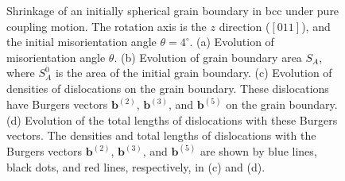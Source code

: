 \documentclass[smallextended]{svjour3}
\begin{document}
%

\begin{figure}[htbp]
	\centering
	\caption{Shrinkage of an initially spherical grain boundary in bcc under pure coupling motion. The rotation axis is the $z$ direction ($[011]$), and the initial misorientation angle $\theta=4^\circ$.  (a) Evolution of  misorientation angle $\theta$. (b) Evolution of grain boundary area $S_A$, where $S_A^0$ is the area of the initial grain boundary. (c) Evolution of densities of dislocations on the grain boundary. These dislocations have Burgers vectors
 $\mathbf b^{(2)}$, $\mathbf b^{(3)}$, and $\mathbf b^{(5)}$ on the grain boundary. (d) Evolution of the total lengths of dislocations with these Burgers vectors.
 The densities and total lengths of dislocations with the Burgers vectors $\mathbf b^{(2)}$, $\mathbf b^{(3)}$, and $\mathbf b^{(5)}$  are shown by blue lines, black dots, and red lines, respectively, in (c) and (d).
}\label{fig:bcctheta0}
\end{figure}
\end{document}
